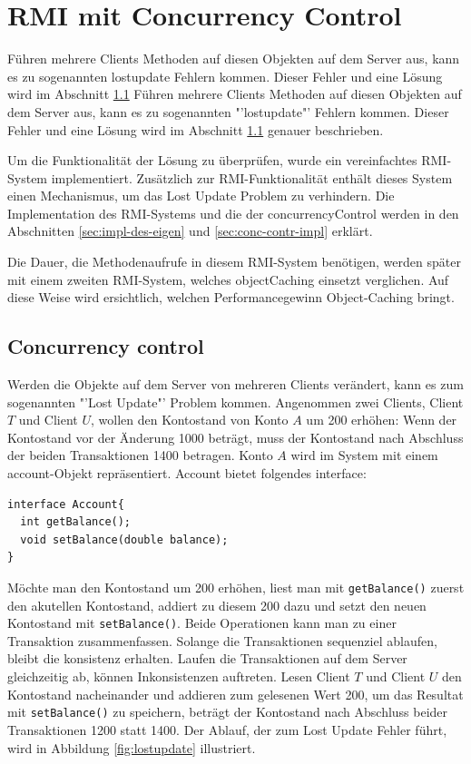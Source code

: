 \chapter{RMI mit Concurrency Control}


Führen mehrere Clients Methoden auf diesen Objekten auf dem Server aus,
kann es zu sogenannten \gls{lostupdate} Fehlern kommen. Dieser Fehler  und eine Lösung wird im Abschnitt \ref{sec:concurrency-control}
Führen mehrere Clients Methoden auf diesen Objekten auf dem Server aus,
kann es zu sogenannten "'\gls{lostupdate}"' Fehlern kommen. Dieser Fehler und eine Lösung wird im Abschnitt \ref{sec:concurrency-control}
genauer beschrieben. 

Um die Funktionalität der Lösung zu überprüfen, wurde ein
vereinfachtes \gls{RMI}-System implementiert. Zusätzlich zur
RMI-Funktionalität ent\-hält dies\-es System einen Mechanismus, um das Lost
Update Problem zu verhindern. Die Implementation des RMI-Systems und
die der \gls{concurrencyControl} werden in den Abschnitten
\ref{sec:impl-des-eigen} und \ref{sec:conc-contr-impl} erklärt.

Die Dauer, die Methodenaufrufe in diesem RMI-System benötigen, werden
später mit einem zweiten RMI-System, welches \gls{objectCaching} einsetzt
verglichen. Auf diese Weise wird ersichtlich, welchen
Performancegewinn Object-Caching bringt.


\section{Concurrency control}
\label{sec:concurrency-control}
Werden die Objekte auf dem Server von mehreren Clients verändert, kann
es zum sogenannten "'Lost Update"' Problem kommen. Angenommen zwei
Clients, Client $T$ und Client $U$, wollen den Kontostand von Konto
$A$ um 200 erhöhen: Wenn der Kontostand vor der Änderung 1000 beträgt,
muss der Kontostand nach Abschluss der beiden Transaktionen 1400
betragen. Konto $A$ wird im System mit einem \gls{account}-Objekt
repräsentiert. Account bietet folgendes \gls{interface}:

\lstset{language=Java}
\begin{lstlisting}
interface Account{
  int getBalance();
  void setBalance(double balance);
}
\end{lstlisting}

Möchte man den Kontostand um 200 erhöhen, liest man mit \newline
\verb|getBalance()| zuerst den akutellen Kontostand, addiert zu
diesem 200 dazu und setzt den neuen Kontostand mit
\verb|setBalance()|. Beide Operationen kann man zu einer Transaktion
zusammenfassen. Solange die Transaktionen sequenziel ablaufen, bleibt die
\gls{konsistenz} erhalten. Laufen die Transaktionen auf dem Server
gleichzeitig ab, können Inkonsistenzen auftreten. Lesen Client $T$ und
Client $U$ den Kontostand nacheinander und addieren zum gelesenen Wert
200, um das Resultat mit \verb|setBalance()| zu speichern, beträgt der
Kontostand nach Abschluss beider Transaktionen 1200 statt 1400. Der
Ablauf, der zum Lost Update Fehler führt, wird in Abbildung
\ref{fig:lostupdate} illustriert.

